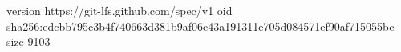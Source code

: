 version https://git-lfs.github.com/spec/v1
oid sha256:edcbb795c3b4f740663d381b9af06e43a191311e705d084571ef90af715055bc
size 9103
